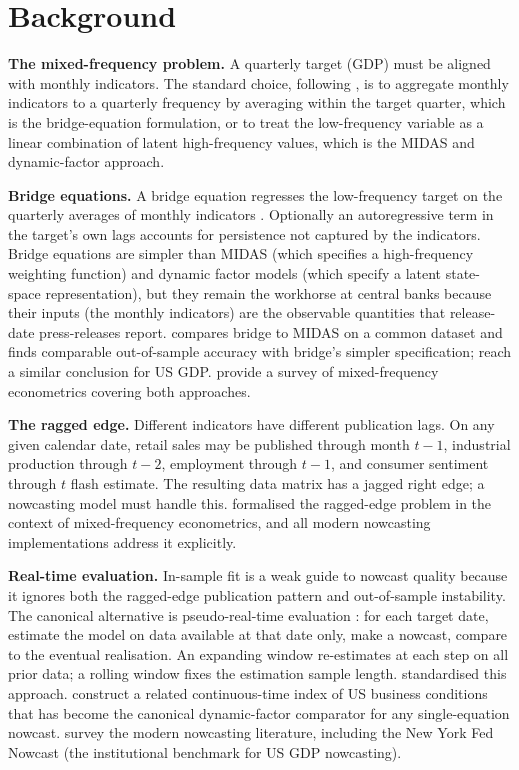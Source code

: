 \section{Background}\label{background}

\textbf{The mixed-frequency problem.} A quarterly target (GDP) must be
aligned with monthly indicators. The standard choice, following
\citet{mariano2003new}, is to aggregate monthly indicators to a quarterly
frequency by averaging within the target quarter, which is the
bridge-equation formulation, or to treat the low-frequency variable
as a linear combination of latent high-frequency values, which is
the MIDAS and dynamic-factor approach.

\textbf{Bridge equations.} A bridge equation regresses the low-frequency
target on the quarterly averages of monthly indicators
\citep{baffigi2004bridge}. Optionally an autoregressive term in the
target's own lags accounts for persistence not captured by the
indicators. Bridge equations are simpler than MIDAS (which specifies
a high-frequency weighting function) and dynamic factor models
(which specify a latent state-space representation), but they remain
the workhorse at central banks because their inputs (the monthly
indicators) are the observable quantities that release-date
press-releases report. \citet{schumacher2016comparison} compares bridge to
MIDAS on a common dataset and finds comparable out-of-sample
accuracy with bridge's simpler specification; \citet{clements2008macroeconomic}
reach a similar conclusion for US GDP. \citet{foroni2013survey} provide a
survey of mixed-frequency econometrics covering both approaches.

\textbf{The ragged edge.} Different indicators have different publication
lags. On any given calendar date, retail sales may be published
through month \(t-1\), industrial production through \(t-2\), employment
through \(t-1\), and consumer sentiment through \(t\) flash estimate.
The resulting data matrix has a jagged right edge; a nowcasting
model must handle this. \citet{wallis1986forecasting} formalised the
ragged-edge problem in the context of mixed-frequency econometrics,
and all modern nowcasting implementations address it explicitly.

\textbf{Real-time evaluation.} In-sample fit is a weak guide to nowcast
quality because it ignores both the ragged-edge publication pattern
and out-of-sample instability. The canonical alternative is
pseudo-real-time evaluation \citep{stark2002database}: for each target
date, estimate the model on data available at that date only, make
a nowcast, compare to the eventual realisation. An expanding window
re-estimates at each step on all prior data; a rolling window fixes
the estimation sample length. \citet{giannone2008nowcasting} standardised
this approach. \citet{aruoba2009real} construct a related continuous-time
index of US business conditions that has become the canonical
dynamic-factor comparator for any single-equation nowcast.
\citet{bok2018macroeconomic} survey the modern nowcasting literature,
including the New York Fed Nowcast (the institutional benchmark for
US GDP nowcasting).

